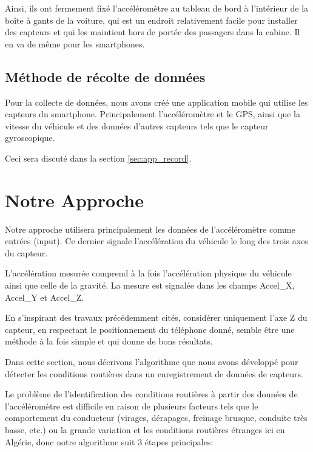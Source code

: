 Ainsi, ils ont fermement fixé l'accéléromètre au tableau de bord à l'intérieur de la boîte à gants de la voiture, qui est un endroit relativement facile pour installer des capteurs et qui les maintient hors de portée des passagers dans la cabine. Il en va de même pour les smartphones.


\subsection{Méthode de récolte de données}
Pour la collecte de données, nous avons créé une application mobile qui utilise les capteurs du smartphone. Principalement l'accéléromètre et le GPS, ainsi que la vitesse du véhicule et des données d'autres capteurs tels que le capteur gyroscopique.

Ceci sera discuté dans la section \ref{sec:app_record}.

\section{Notre Approche}
Notre approche utilisera principalement les données de l'accéléromètre comme entrées (input).
Ce dernier signale l'accélération du véhicule le long des trois axes du capteur. 

L'accélération mesurée comprend à la fois l'accélération physique du véhicule ainsi que celle de la gravité. La  mesure est signalée dans les champs Accel\_X, Accel\_Y et Accel\_Z. 

En s'inspirant des travaux précédemment cités, considérer uniquement l'axe Z du capteur, en respectant le positionnement du téléphone donné, semble être une méthode à la fois simple et qui donne de bons résultats.

Dans cette section, nous décrivons l'algorithme que nous avons développé pour détecter les conditions routières dans un enregistrement de données de capteurs. 

Le problème de l'identification des conditions routières à partir des données de l'accéléromètre est difficile en raison de plusieurs facteurs tels que le comportement du conducteur (virages, dérapages, freinage brusque, conduite très basse, etc.) ou la grande variation et les conditions routières étranges ici en Algérie, donc notre algorithme suit 3 étapes principales:

